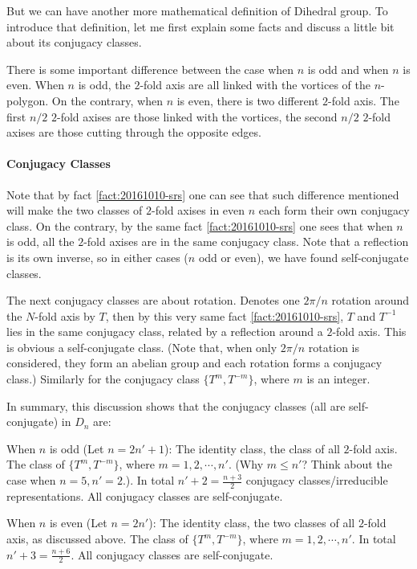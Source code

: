 But we can have another more mathematical definition of Dihedral
group. To introduce that definition, let me first explain some facts
and discuss a little bit about its conjugacy classes.

There is some important difference between the case when $n$ is odd
and when $n$ is even. When $n$ is odd, the $2$-fold axis are all
linked with the vortices of the $n$-polygon. On the contrary, when $n$
is even, there is two different $2$-fold axis. The first $n/2$
$2$-fold axises are those linked with the vortices, the second $n/2$
$2$-fold axises are those cutting through the opposite edges. 

\paragraph{Conjugacy Classes}
Note that by fact \ref{fact:20161010-srs} one can see that such
difference mentioned will make the two classes of $2$-fold axises in
even $n$ each form their own conjugacy class. On the contrary, by the
same fact \ref{fact:20161010-srs} one sees that when $n$ is odd, all
the $2$-fold axises are in the same conjugacy class. Note that a
reflection is its own inverse, so in either cases ($n$ odd or even),
we have found self-conjugate classes.

The next conjugacy classes are about rotation. Denotes one $2\pi/n$
rotation around the $N$-fold axis by $T$, then by this very same fact
\ref{fact:20161010-srs}, $T$ and $T^{-1}$ lies in the same conjugacy
class, related by a reflection around a $2$-fold axis. This is obvious
a self-conjugate class. (Note that, when only $2\pi/n$ rotation is
considered, they form an abelian group and each rotation forms a
conjugacy class.) Similarly for the conjugacy class $\{T^m, T^{-m}\}$,
where $m$ is an integer.

In summary, this discussion shows that the conjugacy classes (all are
self-conjugate) in $D_n$
are:
\begin{fact}
    When $n$ is odd (Let $n=2n'+1$): The identity class, the class of
    all $2$-fold axis. The class of $\{ T^m, T^{-m}\}$, where
    $m=1,2,\cdots, n'$. (Why $m\leq n'$? Think about the case when
    $n=5,n'=2$.). In total $n'+2=\frac{n+3}{2}$ conjugacy
    classes/irreducible representations. All conjugacy classes are
    self-conjugate.
\end{fact}
\begin{fact}
    When $n$ is even (Let $n=2n'$): The identity class, the two
    classes of all $2$-fold axis, as discussed above. The class of
    $\{ T^m, T^{-m}\}$, where $m=1,2,\cdots, n'$. In total
    $n'+3=\frac{n+6}{2}$. All conjugacy classes are self-conjugate.
\end{fact}


